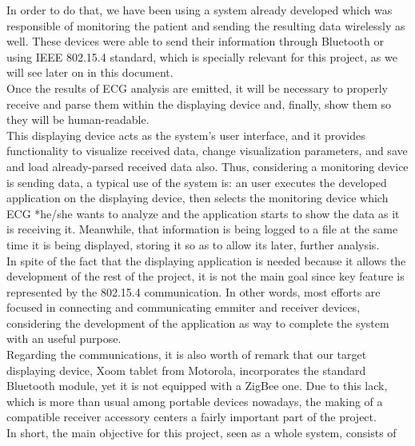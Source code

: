		
		In order to do that, we have been using a system already developed which
		was responsible of monitoring the patient and sending the resulting data wirelessly as well. These
		devices were able to send their information through Bluetooth or using IEEE 802.15.4 standard, which
		is specially relevant for this project, as we will see later on in this document.\\
		Once the results of ECG analysis are emitted, it will be necessary to properly receive and parse them
		within the displaying device and, finally, show them so they will be human-readable.\\
		This displaying device acts as the system's user interface, and it provides
		functionality to visualize received data, change visualization parameters, and save and load
		already-parsed received data also. Thus, considering a monitoring device is sending data,
		a typical use of the system is: an user executes the developed application on the displaying
		device, then selects the monitoring device which ECG *he/she wants to analyze and the application %
		starts to show the data as it is receiving it. Meanwhile, that information is being logged to 
		a file at the same time it is being displayed, storing it so as to allow its later, further
		analysis.\\
		In spite of the fact that the displaying application is needed because it allows the development of
		the rest of the project, it is not the main goal since key feature is represented by the 802.15.4
		communication. In other words, most efforts are focused in connecting and communicating emmiter and
		receiver devices, considering the development of the application as way to complete the system with 
		an useful purpose.\\
		Regarding the communications, it is also worth of remark that our target displaying device, Xoom tablet 
		from Motorola, incorporates the standard Bluetooth module, yet it is not equipped with a ZigBee one.
		Due to this lack, which is more than usual among portable devices nowadays, the making of a compatible 
		receiver accessory centers a fairly important part of the project.\\
		In short, the main objective for this project, seen as a whole system, consists of
